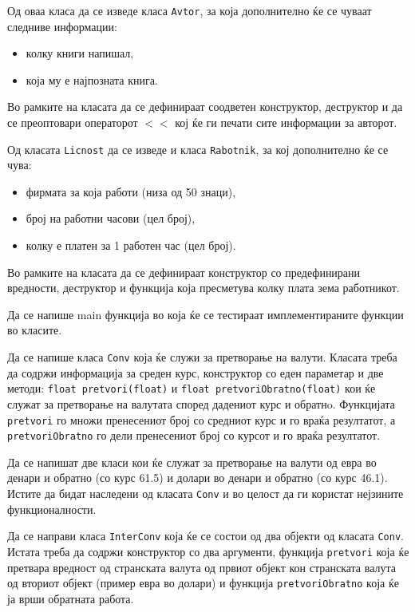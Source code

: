 \documentclass[12pt,a4paper]{exam}
\begin{document}
\begin{questions}
Од оваа класа да се изведе класа \texttt{Avtor}, за која дополнително ќе се
чуваат следниве информации:
\begin{itemize}
  \item колку книги напишал,
  \item која му е најпозната книга.
\end{itemize}
Во рамките на класата да се дефинираат соодветен конструктор,
деструктор и да се преоптовари операторот $<<$ кој
ќе ги печати сите информации за авторот. 

Од класата \texttt{Licnost} да се изведе и класа \texttt{Rabotnik}, за кој
дополнително ќе се чува:
\begin{itemize}
  \item фирмата за која работи (низа од 50 знаци),
  \item број на работни часови (цел број),
  \item колку е платен за 1 работен час (цел број).
\end{itemize}
Во рамките на класата да се дефинираат конструктор со предефинирани вредности,
деструктор и функција која пресметува колку плата зема работникот.

Да се напише main функција во која ќе се тестираат имплементираните функции во
класите.

\question
Да се напише класа \texttt{Conv} која ќе служи за претворање на валути. Класата
треба да содржи информација за среден курс, конструктор со еден параметар и две
методи: \texttt{float pretvori(float)} и \texttt{float pretvoriObratno(float)}
кои ќе служат за претворање на валутата според дадениот курс и обратнo.
Функцијата \texttt{pretvori} го множи пренесениот број со средниот курс и го
враќа резултатот, а \texttt{pretvoriObratno} го дели пренесениот број со курсот
и го враќа резултатот. 

Да се напишат две класи кои ќе служат за претворање на валути од евра во денари
и обратно (со курс 61.5) и долари во денари и обратно (со курс 46.1). Истите да бидат
наследени од класата \texttt{Conv} и во целост да ги користат нејзините функционалности.

Да се направи класа \texttt{InterConv} која ќе се состои од два објекти од
класата \texttt{Conv}. Истата треба да содржи конструктор со два аргументи,
функција \texttt{pretvori} која ќе претвара вредност од странската валута од
првиот објект кон странската валута од вториот објект (пример евра во долари) и
функција \texttt{pretvoriObratno} која ќе ја врши обратната работа. 


\end{questions}
\end{document}
